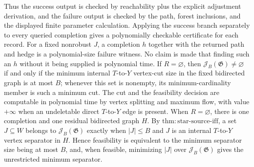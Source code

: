 Thus the success output is checked by reachability plus the explicit adjustment derivation, and the failure output is checked by the path, forest inclusions, and the displayed finite parameter calculation.  Applying the success branch separately to every queried completion gives a polynomially checkable certificate for each record.  For a fixed nonrobust \(J\), a completion \(h\) together with the returned path and hedge is a polynomial-size failure witness.  No claim is made that finding such an \(h\) without it being supplied is polynomial time.
If \(R=\varnothing\), then \(\mathcal J_B(\mathfrak G)\ne\varnothing\) if and only if the minimum internal \(T\)-to-\(Y\) vertex-cut size in the fixed bidirected graph is at most \(B\); whenever this set is nonempty, its minimum-cardinality member is such a minimum cut. The cut and the feasibility decision are computable in polynomial time by vertex splitting and maximum flow, with value \(+\infty\) when an undeletable direct \(T\)-to-\(Y\) edge is present.
When \(R=\varnothing\), there is one completion and one residual bidirected graph \(H\).  By \(\mathrm{thm{:}star\text{-}source\text{-}iff}\), a set \(J\subseteq W\) belongs to \(\mathcal J_B(\mathfrak G)\) exactly when \(|J|\le B\) and \(J\) is an internal \(T\)-to-\(Y\) vertex separator in \(H\).  Hence feasibility is equivalent to the minimum separator size being at most \(B\), and, when feasible, minimizing \(|J|\) over \(\mathcal J_B(\mathfrak G)\) gives the unrestricted minimum separator.

